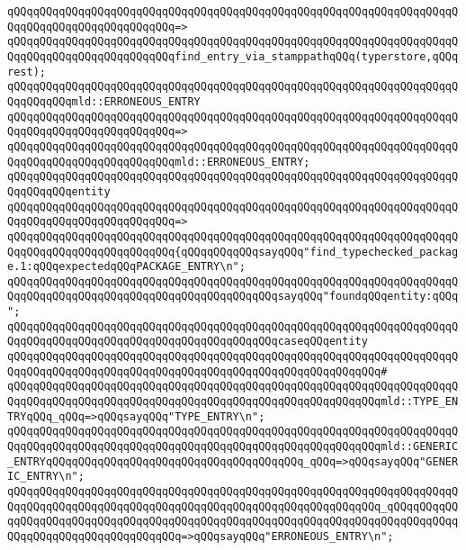 \verb|qQQqqQQqqQQqqQQqqQQqqQQqqQQqqQQqqQQqqQQqqQQqqQQqqQQqqQQqqQQqqQQqqQQqqQQqqQQqqQQqqQQqqQQqqQQqqQQq=>|\newline
\verb|qQQqqQQqqQQqqQQqqQQqqQQqqQQqqQQqqQQqqQQqqQQqqQQqqQQqqQQqqQQqqQQqqQQqqQQqqQQqqQQqqQQqqQQqqQQqqQQqfind_entry_via_stamppathqQQq(typerstore,qQQqrest);|\newline
\newline
\verb|qQQqqQQqqQQqqQQqqQQqqQQqqQQqqQQqqQQqqQQqqQQqqQQqqQQqqQQqqQQqqQQqqQQqqQQqqQQqqQQqmld::ERRONEOUS_ENTRY|\newline
\verb|qQQqqQQqqQQqqQQqqQQqqQQqqQQqqQQqqQQqqQQqqQQqqQQqqQQqqQQqqQQqqQQqqQQqqQQqqQQqqQQqqQQqqQQqqQQqqQQq=>|\newline
\verb|qQQqqQQqqQQqqQQqqQQqqQQqqQQqqQQqqQQqqQQqqQQqqQQqqQQqqQQqqQQqqQQqqQQqqQQqqQQqqQQqqQQqqQQqqQQqqQQqmld::ERRONEOUS_ENTRY;|\newline
\newline
\verb|qQQqqQQqqQQqqQQqqQQqqQQqqQQqqQQqqQQqqQQqqQQqqQQqqQQqqQQqqQQqqQQqqQQqqQQqqQQqqQQqentity|\newline
\verb|qQQqqQQqqQQqqQQqqQQqqQQqqQQqqQQqqQQqqQQqqQQqqQQqqQQqqQQqqQQqqQQqqQQqqQQqqQQqqQQqqQQqqQQqqQQqqQQq=>|\newline
\verb|qQQqqQQqqQQqqQQqqQQqqQQqqQQqqQQqqQQqqQQqqQQqqQQqqQQqqQQqqQQqqQQqqQQqqQQqqQQqqQQqqQQqqQQqqQQqqQQq{qQQqqQQqqQQqsayqQQq"find_typechecked_package.1:qQQqexpectedqQQqPACKAGE_ENTRY\n";|\newline
\verb|qQQqqQQqqQQqqQQqqQQqqQQqqQQqqQQqqQQqqQQqqQQqqQQqqQQqqQQqqQQqqQQqqQQqqQQqqQQqqQQqqQQqqQQqqQQqqQQqqQQqqQQqqQQqqQQqsayqQQq"foundqQQqentity:qQQq";|\newline
\newline
\verb|qQQqqQQqqQQqqQQqqQQqqQQqqQQqqQQqqQQqqQQqqQQqqQQqqQQqqQQqqQQqqQQqqQQqqQQqqQQqqQQqqQQqqQQqqQQqqQQqqQQqqQQqqQQqqQQqcaseqQQqentity|\newline
\verb|qQQqqQQqqQQqqQQqqQQqqQQqqQQqqQQqqQQqqQQqqQQqqQQqqQQqqQQqqQQqqQQqqQQqqQQqqQQqqQQqqQQqqQQqqQQqqQQqqQQqqQQqqQQqqQQqqQQqqQQqqQQqqQQq#|\newline
\verb|qQQqqQQqqQQqqQQqqQQqqQQqqQQqqQQqqQQqqQQqqQQqqQQqqQQqqQQqqQQqqQQqqQQqqQQqqQQqqQQqqQQqqQQqqQQqqQQqqQQqqQQqqQQqqQQqqQQqqQQqqQQqqQQqmld::TYPE_ENTRYqQQq_qQQq=>qQQqsayqQQq"TYPE_ENTRY\n";|\newline
\verb|qQQqqQQqqQQqqQQqqQQqqQQqqQQqqQQqqQQqqQQqqQQqqQQqqQQqqQQqqQQqqQQqqQQqqQQqqQQqqQQqqQQqqQQqqQQqqQQqqQQqqQQqqQQqqQQqqQQqqQQqqQQqqQQqmld::GENERIC_ENTRYqQQqqQQqqQQqqQQqqQQqqQQqqQQqqQQqqQQqqQQq_qQQq=>qQQqsayqQQq"GENERIC_ENTRY\n";|\newline
\verb|qQQqqQQqqQQqqQQqqQQqqQQqqQQqqQQqqQQqqQQqqQQqqQQqqQQqqQQqqQQqqQQqqQQqqQQqqQQqqQQqqQQqqQQqqQQqqQQqqQQqqQQqqQQqqQQqqQQqqQQqqQQqqQQq_qQQqqQQqqQQqqQQqqQQqqQQqqQQqqQQqqQQqqQQqqQQqqQQqqQQqqQQqqQQqqQQqqQQqqQQqqQQqqQQqqQQqqQQqqQQqqQQqqQQqqQQqqQQq=>qQQqsayqQQq"ERRONEOUS_ENTRY\n";|\newline
